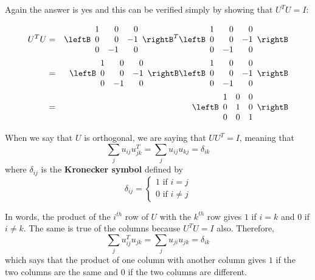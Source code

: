 \begin{solution}
Again the answer is yes and this can be verified simply by showing that $U^{T}U=I$: 

\begin{eqnarray*}
U^{T}U&=&\leftB 
\begin{array}{rrr}
1 & 0 & 0 \\ 
0 & 0 & -1 \\ 
0 & -1 & 0
\end{array}
\rightB ^{T}\leftB 
\begin{array}{rrr}
1 & 0 & 0 \\ 
0 & 0 & -1 \\ 
0 & -1 & 0
\end{array}
\rightB \\
&=&\leftB 
\begin{array}{rrr}
1 & 0 & 0 \\ 
0 & 0 & -1 \\ 
0 & -1 & 0
\end{array}
\rightB \leftB 
\begin{array}{rrr}
1 & 0 & 0 \\ 
0 & 0 & -1 \\ 
0 & -1 & 0
\end{array}
\rightB \\
&=&\leftB 
\begin{array}{rrr}
1 & 0 & 0 \\ 
0 & 1 & 0 \\ 
0 & 0 & 1
\end{array}
\rightB
\end{eqnarray*}
\end{solution}

When we say that $U$ is orthogonal, we are saying that $UU^T=I$, meaning that
\begin{equation*}
\sum_{j}u_{ij}u_{jk}^{T}=\sum_{j}u_{ij}u_{kj}=\delta _{ik}
\end{equation*}
where $\delta _{ij}$ is the \textbf{Kronecker symbol}
defined
 by
\begin{equation*}
\delta _{ij}=\left\{
\begin{array}{c}
1
\text{ if }i=j \\
0\text{ if }i\neq j
\end{array}
\right.
\end{equation*}

In words, the product of the $i^{th}$ row of $U$ with the $k^{th}$ row
gives $1$ if $i=k$ and $0$ if $i\neq k.$ The same is true of the columns because 
$U^{T}U=I$ also. Therefore, 
\begin{equation*}
\sum_{j}u_{ij}^{T}u_{jk}=\sum_{j}u_{ji}u_{jk}=\delta _{ik}
\end{equation*}
which says that the product of one column with another column gives $1$ if the two
columns are the same and $0$ if the two columns are different.

